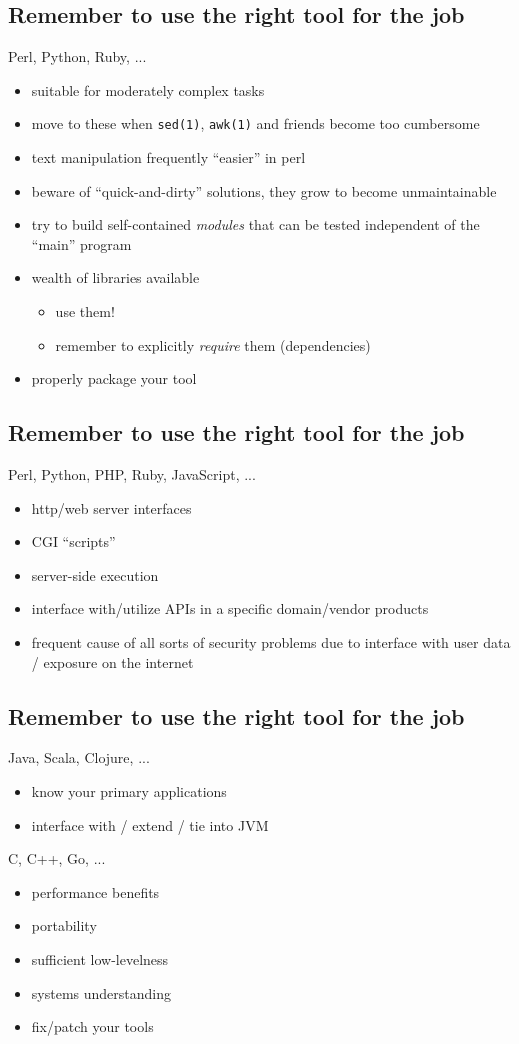 \documentclass[xga]{xdvislides}
\begin{document}
\subsection{Remember to use the right tool for the job}
Perl, Python, Ruby, ...
\begin{itemize}
	\item suitable for moderately complex tasks
	\item move to these when {\tt sed(1)}, {\tt awk(1)} and friends
		become too cumbersome
	\item text manipulation frequently ``easier'' in perl
	\item beware of ``quick-and-dirty'' solutions, they grow to become
		unmaintainable
	\item try to build self-contained {\em modules} that can be tested
		independent of the ``main'' program
	\item wealth of libraries available
		\begin{itemize}
			\item use them!
			\item remember to explicitly {\em require} them
				(dependencies)
		\end{itemize}
	\item properly package your tool
\end{itemize}

\subsection{Remember to use the right tool for the job}
Perl, Python, PHP, Ruby, JavaScript, ...
\begin{itemize}
	\item http/web server interfaces
	\item CGI ``scripts''
	\item server-side execution
	\item interface with/utilize APIs in a specific domain/vendor products
	\item frequent cause of all sorts of security problems due to
		interface with user data / exposure on the internet
\end{itemize}

\subsection{Remember to use the right tool for the job}
Java, Scala, Clojure, ...
\begin{itemize}
	\item know your primary applications
	\item interface with / extend / tie into JVM
\end{itemize}
\vspace{.5in}
C, C++, Go, ...
\begin{itemize}
	\item performance benefits
	\item portability
	\item sufficient low-levelness
	\item systems understanding
	\item fix/patch your tools
\end{itemize}
\end{document}
